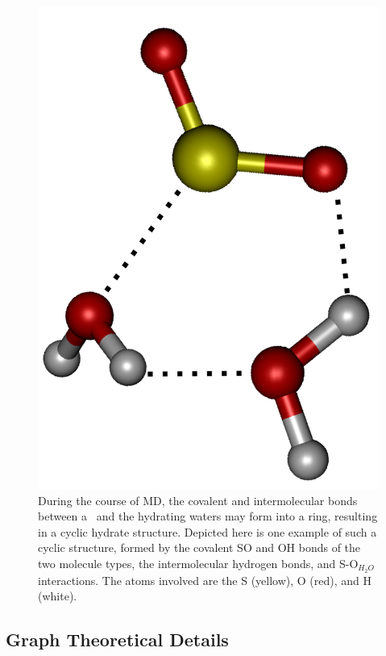\begin{figure}[h!]
	\begin{center}
		\includegraphics[scale=1.0]{images/cycles/double-cycle-type2-small.png}
		\caption{During the course of MD, the covalent and intermolecular bonds between a \suldiox~and the hydrating waters may form into a ring, resulting in a cyclic hydrate structure. Depicted here is one example of such a cyclic structure, formed by the covalent SO and OH bonds of the two molecule types, the intermolecular hydrogen bonds, and S-O$_{H_2O}$ interactions. The atoms involved are the S (yellow), O (red), and H (white).}
		\label{fig:cyclic-example}
	\end{center}
\end{figure}

\subsection {Graph Theoretical Details}

